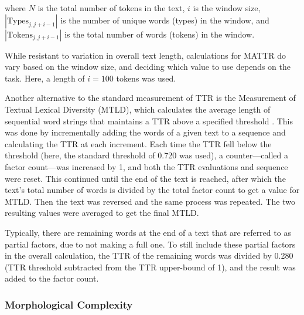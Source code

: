 \documentclass[12pt,a4paper]{article}
\numberwithin{figure}{section}
\numberwithin{table}{section}
\numberwithin{definition}{section}
\begin{document}
where \( N \) is the total number of tokens in the text, \( i \) is the window size, \( |\text{Types}_{j,j+i-1}| \) is the number of unique words (types) in the window, and \( |\text{Tokens}_{j,j+i-1}| \) is the total number of words (tokens) in the window.


While resistant to variation in overall text length, calculations for MATTR do vary based on the window size, and deciding which value to use depends on the task. Here, a length of \( i = 100 \) tokens was used. 

Another alternative to the standard measurement of TTR is the Measurement of Textual Lexical Diversity (MTLD), which calculates the average length of sequential word strings that maintains a TTR above a specified threshold \parencite{Bestgen2024article}. This was done by incrementally adding the words of a given text to a sequence and calculating the TTR at each increment. Each time the TTR fell below the threshold (here, the standard threshold of 0.720 \parencite{McCarthy2010article,Fergadiotis2013article} was used), a counter---called a factor count---was increased by 1, and both the TTR evaluations and sequence were reset. This continued until the end of the text is reached, after which the text's total number of words is divided by the total factor count to get a value for MTLD. Then the text was reversed and the same process was repeated. The two resulting values were averaged to get the final MTLD. 

Typically, there are remaining words at the end of a text that are referred to as partial factors, due to not making a full one. To still include these partial factors in the overall calculation, the TTR of the remaining words was divided by 0.280 (TTR threshold subtracted from the TTR upper-bound of 1), and the result was added to the factor count.


\subsubsection{Morphological Complexity}
\label{ssec:morphologicalcomplexity}
\end{document}
